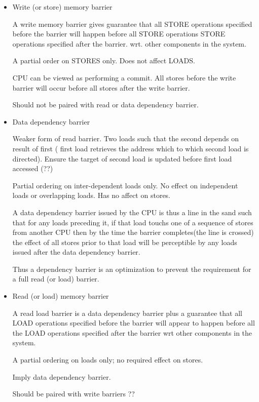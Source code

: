 \documentclass{article}
\begin{document}
\begin{itemize}
\item Write (or store) memory barrier

  A write memory barrier gives guarantee that all STORE operations
  specified before the barrier will happen before all STORE operations
  STORE operations specified after the barrier. wrt. other components
  in the system.

  A partial order on STORES only. Does not affect LOADS.

  CPU can be viewed as performing a commit. All stores before the
  write barrier will occur before all stores after the write barrier.

  Should not be paired with read or data dependency barrier.
  
\item Data dependency barrier

  Weaker form of read barrier. Two loads such that the second depends
  on result of first ( first load retrieves the address which to which
  second load is directed). Ensure the target of second load is
  updated before first load accessed (??)

  Partial ordering on inter-dependent loads only. No effect on
  independent loads or overlapping loads. Has no affect on stores.

  A data dependency barrier issued by the CPU is thus a line in the
  sand such that for any loads preceding it, if that load touchs one
  of a sequence of stores from another CPU then by the time the
  barrier completes(the line is crossed) the effect of all stores
  prior to that load will be perceptible by any loads issued after the
  data dependency barrier.

  Thus a dependency barrier is an optimization to prevent the
  requirement for a full read (or load) barrier.


\item Read (or load) memory barrier

  A read load barrier is a data dependency barrier plus a guarantee
  that all LOAD operations specified before the barrier will appear to
  happen before all the LOAD operations specified after the barrier
  wrt other components in the system.

  A partial ordering on loads only; no required effect on stores.

  Imply data dependency barrier.

  Should be paired with write barriers ??


\end{itemize}
\end{document}
